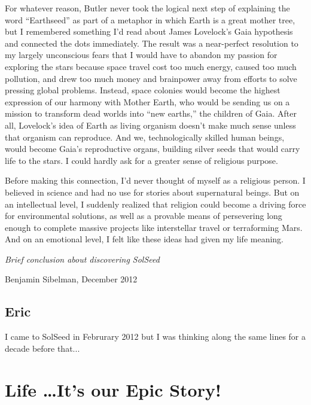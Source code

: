 \documentclass[ebook,12pt,openany,twoside]{memoir}
\newcommand{\imagefacingchapter}[1]{
  \cleartoverso
  \clearpage \null
  \thispagestyle{cleared}
  \AddToShipoutPictureBG*{%
    \AtStockLowerLeft{%
      \texttt{[image: \#1]}
    }
  }
  \clearpage
}
\begin{document}
For whatever reason, Butler never took the logical next step of explaining the word ``Earthseed'' as part of a metaphor in which Earth is a great mother tree, but I remembered something I'd read about James Lovelock's Gaia hypothesis and connected the dots immediately.  The result was a near-perfect resolution to my largely unconscious fears that I would have to abandon my passion for exploring the stars because space travel cost too much energy, caused too much pollution, and drew too much money and brainpower away from efforts to solve pressing global problems.  Instead, space colonies would become the highest expression of our harmony with Mother Earth, who would be sending us on a mission to transform dead worlds into ``new earths,'' the children of Gaia.  After all, Lovelock's idea of Earth as living organism doesn't make much sense unless that organism can reproduce.  And we, technologically skilled human beings, would become Gaia's reproductive organs, building silver seeds that would carry life to the stars.  I could hardly ask for a greater sense of religious purpose.

Before making this connection, I'd never thought of myself as a religious person.  I believed in science and had no use for stories about supernatural beings.  But on an intellectual level, I suddenly realized that religion could become a driving force for environmental solutions, as well as a provable means of persevering long enough to complete massive projects like interstellar travel or terraforming Mars.  And on an emotional level, I felt like these ideas had given my life meaning.

{\em Brief conclusion about discovering SolSeed}

Benjamin Sibelman, December 2012

\clearpage \null
\thispagestyle{cleared}

\chapter*{Eric}

I came to SolSeed in Februrary 2012 but I was thinking along the same lines for a decade before that...

\cleartorecto
\thispagestyle{cleared}
\nobookblankpage
{}

\imagefacingchapter{images/LifeIsPrecious-comp}
\nopartblankpage
\part{Life \ldots It's our Epic Story!}
\end{document}
